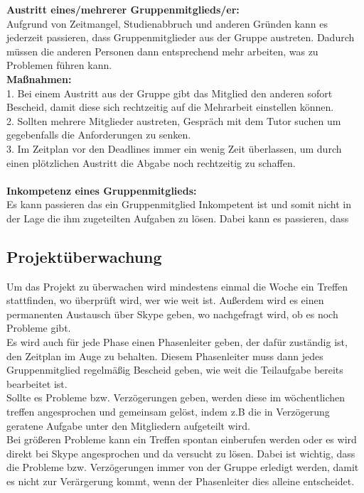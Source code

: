 \documentclass[fontsize=12pt,paper=a4,twoside]{scrartcl}
\begin{document}
\textbf{Austritt eines/mehrerer Gruppenmitglieds/er:}\\
Aufgrund von Zeitmangel, Studienabbruch und anderen Gründen kann es jederzeit passieren, dass Gruppenmitglieder aus der Gruppe austreten. Dadurch müssen die anderen Personen dann entsprechend mehr arbeiten, was zu Problemen führen kann.\\
\textbf{Maßnahmen:}\\
1. Bei einem Austritt aus der Gruppe gibt das Mitglied den anderen sofort Bescheid, damit diese sich rechtzeitig auf die Mehrarbeit einstellen können.\\
2. Sollten mehrere Mitglieder austreten, Gespräch mit dem Tutor suchen um gegebenfalls die Anforderungen zu senken.\\
3. Im Zeitplan vor den Deadlines immer ein wenig Zeit überlassen, um durch einen plötzlichen Austritt die Abgabe noch rechtzeitig zu schaffen.\\
\bigskip \\
\textbf{Inkompetenz eines Gruppenmitglieds:}\\
Es kann passieren das ein Gruppenmitglied Inkompetent ist und somit nicht in der Lage die ihm zugeteilten Aufgaben zu lösen. Dabei kann es passieren, dass 

\subsection{Projektüberwachung}\label{3.4-controlling}

Um das Projekt zu überwachen wird mindestens einmal die Woche ein Treffen stattfinden, wo überprüft wird, wer wie weit ist. Außerdem wird es einen permanenten Austausch über Skype geben, wo nachgefragt wird, ob es noch Probleme gibt. \\
Es wird auch für jede Phase einen Phasenleiter geben, der dafür zuständig ist, den Zeitplan im Auge zu behalten. Diesem Phasenleiter muss dann jedes Gruppenmitglied regelmäßig Bescheid geben, wie weit die Teilaufgabe bereits bearbeitet ist.\\
Sollte es Probleme bzw. Verzögerungen geben, werden diese im wöchentlichen treffen angesprochen und gemeinsam gelöst, indem z.B die in Verzögerung geratene Aufgabe unter den Mitgliedern aufgeteilt wird.\\
Bei größeren Probleme kann ein Treffen spontan einberufen werden oder es wird direkt bei Skype angesprochen und da versucht zu lösen. Dabei ist wichtig, dass die Probleme bzw. Verzögerungen immer von der Gruppe erledigt werden, damit es nicht zur Verärgerung kommt, wenn der Phasenleiter dies alleine entscheidet.
\end{document}

